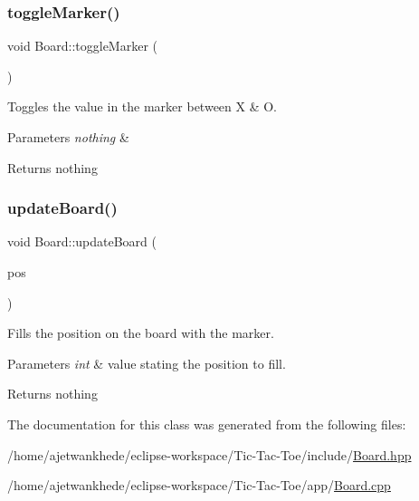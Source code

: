 \subsubsection{\texorpdfstring{toggle\+Marker()}{toggleMarker()}}
{\footnotesize\ttfamily void Board\+::toggle\+Marker (\begin{DoxyParamCaption}{ }\end{DoxyParamCaption})\hspace{0.3cm}{\ttfamily [virtual]}}



Toggles the value in the marker between \textquotesingle{}X\textquotesingle{} \& \textquotesingle{}O\textquotesingle{}. 


\begin{DoxyParams}{Parameters}
{\em nothing} & \\
\hline
\end{DoxyParams}
\begin{DoxyReturn}{Returns}
nothing 
\end{DoxyReturn}
\mbox{\label{classBoard_a44d5f45daeec9a19d48d17aa02601a17}} 
\subsubsection{\texorpdfstring{update\+Board()}{updateBoard()}}
{\footnotesize\ttfamily void Board\+::update\+Board (\begin{DoxyParamCaption}\item[{int}]{pos }\end{DoxyParamCaption})\hspace{0.3cm}{\ttfamily [virtual]}}



Fills the position on the board with the marker. 


\begin{DoxyParams}{Parameters}
{\em int} & value stating the position to fill. \\
\hline
\end{DoxyParams}
\begin{DoxyReturn}{Returns}
nothing 
\end{DoxyReturn}


The documentation for this class was generated from the following files\+:\begin{DoxyCompactItemize}
\item 
/home/ajetwankhede/eclipse-\/workspace/\+Tic-\/\+Tac-\/\+Toe/include/\mbox{\hyperlink{Board_8hpp}{Board.\+hpp}}\item 
/home/ajetwankhede/eclipse-\/workspace/\+Tic-\/\+Tac-\/\+Toe/app/\mbox{\hyperlink{Board_8cpp}{Board.\+cpp}}\end{DoxyCompactItemize}
